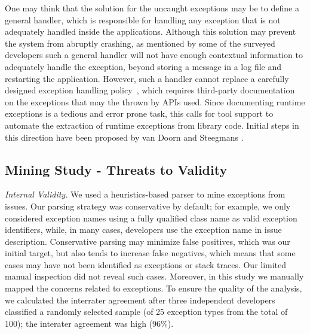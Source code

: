 One may think that the solution for the uncaught exceptions may be to define a general handler, 
which is responsible for handling any exception that is not
adequately handled inside the applications. Although this 
solution may prevent  the system from abruptly crashing, as mentioned by some of the surveyed developers such a general handler will not have enough
contextual information to adequately handle the exception, 
beyond storing a message in a log file and restarting the application.
However, such a handler cannot replace a carefully designed exception 
handling policy~\cite{Robil00}, which requires
third-party documentation on the exceptions that
may the thrown by APIs used. 
Since  documenting runtime exceptions is a tedious and error prone
task, this calls for tool support to automate the extraction of runtime exceptions
from library code. Initial steps in this direction have been proposed
by van Doorn and Steegmans \cite{van2005combining}.




\subsection{Mining Study - Threats to Validity }

\emph{Internal Validity.} We used a heuristics-based parser to mine
exceptions from issues.  Our parsing strategy was conservative by default; for
example, we only considered exception names using a fully qualified class name
as valid exception identifiers, while, in many cases, developers use the
exception name in issue description. Conservative parsing may minimize false
positives, which was our initial target, but also tends to increase false
negatives, which means that some cases may have not been identified as
exceptions or stack traces. Our limited manual inspection did not reveal such
cases. Moreover, in this study we manually mapped the concerns related
to exceptions. To ensure the quality of the analysis, we calculated the
 interrater agreement after three independent 
developers classified a randomly selected sample (of 25 exception 
types from the total of 100); the interater agreement was high (96\%). 

